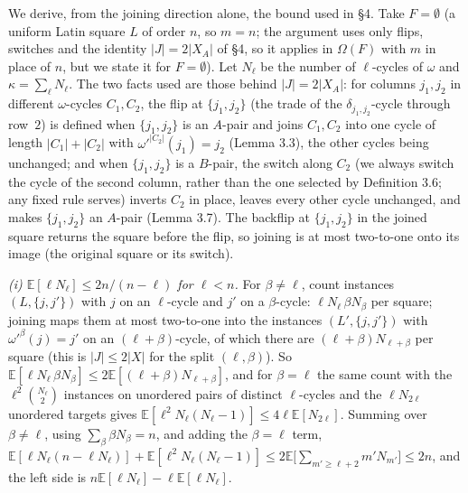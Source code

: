 \documentclass[11pt]{article}
\theoremstyle{remark}
\newcommand{\E}{\mathbb E}
\begin{document}
We derive, from the joining direction alone, the bound used in \S4.
Take $F=\emptyset$ (a uniform Latin square $L$ of order $n$, so $m=n$;
the argument uses only flips, switches and the identity $|J|=2|X_A|$
of \S4, so it applies in $\Omega(F)$ with $m$ in place of $n$, but we
state it for $F=\emptyset$).  Let $N_\ell$ be the number of
$\ell$-cycles of $\omega$ and $\kappa=\sum_\ell N_\ell$.  The two facts
used are those behind $|J|=2|X_A|$: for columns $j_1,j_2$ in different
$\omega$-cycles $C_1,C_2$, the flip at $\{j_1,j_2\}$ (the trade of the
$\delta_{j_1,j_2}$-cycle through row~$2$) is defined when $\{j_1,j_2\}$
is an $A$-pair and joins $C_1,C_2$ into one cycle of length
$|C_1|+|C_2|$ with $\omega'^{|C_2|}(j_1)=j_2$ (Lemma 3.3), the other
cycles being unchanged; and when $\{j_1,j_2\}$ is a $B$-pair, the switch
along $C_2$ (we always switch the cycle of the second column, rather
than the one selected by Definition 3.6; any fixed rule serves)
inverts $C_2$ in place, leaves every other cycle unchanged, and makes
$\{j_1,j_2\}$ an $A$-pair (Lemma 3.7).  The backflip at $\{j_1,j_2\}$ in the joined
square returns the square before the flip, so joining is at most
two-to-one onto its image (the original square or its switch).

\emph{(i) $\E[\ell N_\ell]\le2n/(n-\ell)$ for $\ell<n$.}  For
$\beta\ne\ell$, count instances $(L,\{j,j'\})$ with $j$ on an
$\ell$-cycle and $j'$ on a $\beta$-cycle: $\ell N_\ell\,\beta N_\beta$ per
square; joining maps them at most two-to-one into the instances
$(L',\{j,j'\})$ with $\omega'^{\beta}(j)=j'$ on an $(\ell+\beta)$-cycle,
of which there are $(\ell+\beta)N_{\ell+\beta}$ per square (this is
$|J|\le2|X|$ for the split $(\ell,\beta)$).  So
$\E[\ell N_\ell\,\beta N_\beta]\le2\E[(\ell+\beta)N_{\ell+\beta}]$, and
for $\beta=\ell$ the same count with the $\ell^2\binom{N_\ell}2$
instances on unordered pairs of distinct $\ell$-cycles and the
$\ell N_{2\ell}$ unordered targets gives
$\E[\ell^2N_\ell(N_\ell-1)]\le4\ell\E[N_{2\ell}]$.  Summing over
$\beta\ne\ell$, using $\sum_\beta\beta N_\beta=n$, and adding the
$\beta=\ell$ term,
$\E[\ell N_\ell(n-\ell N_\ell)]+\E[\ell^2N_\ell(N_\ell-1)]\le2\E\bigl[\sum_{m'\ge\ell+2}m'N_{m'}\bigr]\le2n$,
and the left side is $n\E[\ell N_\ell]-\ell\E[\ell N_\ell]$.
\end{document}
